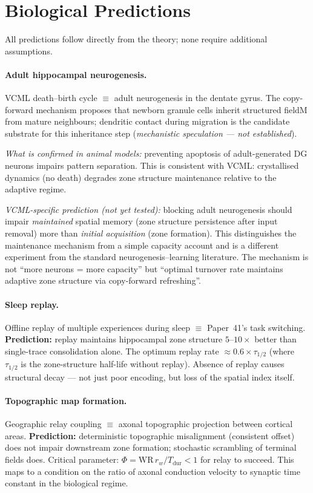 \documentclass[11pt]{article}
\begin{document}
\section{Biological Predictions}

All predictions follow directly from the theory; none require additional assumptions.

\paragraph{Adult hippocampal neurogenesis.}
VCML death--birth cycle $\equiv$ adult neurogenesis in the dentate gyrus.
The copy-forward mechanism proposes that newborn granule cells inherit structured fieldM
from mature neighbours; dendritic contact during migration is the candidate substrate for
this inheritance step (\textit{mechanistic speculation --- not established}).

\textit{What is confirmed in animal models:} preventing apoptosis of adult-generated DG
neurons impairs pattern separation.
This is consistent with VCML: crystallised dynamics (no death) degrades zone structure
maintenance relative to the adaptive regime.

\textit{VCML-specific prediction (not yet tested):} blocking adult neurogenesis should
impair \emph{maintained} spatial memory (zone structure persistence after input removal)
more than \emph{initial acquisition} (zone formation).
This distinguishes the maintenance mechanism from a simple capacity account and is a
different experiment from the standard neurogenesis--learning literature.
The mechanism is not ``more neurons = more capacity'' but ``optimal turnover rate maintains
adaptive zone structure via copy-forward refreshing''.

\paragraph{Sleep replay.}
Offline replay of multiple experiences during sleep $\equiv$ Paper~41's task switching.
\textbf{Prediction:} replay maintains hippocampal zone structure $5$--$10\times$ better than
single-trace consolidation alone.
The optimum replay rate $\approx 0.6 \times \tau_{1/2}$ (where $\tau_{1/2}$ is the
zone-structure half-life without replay).
Absence of replay causes structural decay --- not just poor encoding, but loss of the spatial
index itself.

\paragraph{Topographic map formation.}
Geographic relay coupling $\equiv$ axonal topographic projection between cortical areas.
\textbf{Prediction:} deterministic topographic misalignment (consistent offset) does not
impair downstream zone formation; stochastic scrambling of terminal fields does.
Critical parameter: $\Phi = \mathrm{WR}\,r_w/T_\mathrm{dur} < 1$ for relay to succeed.
This maps to a condition on the ratio of axonal conduction velocity to synaptic time
constant in the biological regime.
\end{document}
